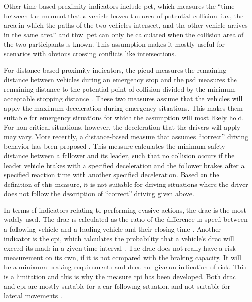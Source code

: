 Other time-based proximity indicators include \ac{pet}, which measures the ``time between the moment that a vehicle leaves the area of potential collision, i.e., the area in which the paths of the two vehicles intersect, and the other vehicle arrives in the same area'' \autocite{mahmud2017application} and \ac{thw}.
\cstartb \ac{pet} can only be calculated when the collision area of the two participants is known. 
This assumption makes it mostly useful for scenarios with obvious crossing conflicts like intersections. \cendb

For distance-based proximity indicators, the \ac{picud} measures the remaining distance between vehicles during an emergency stop \autocite{iida2001traffic, uno2003objective} and the \ac{psd} measures the remaining distance to the potential point of collision divided by the minimum acceptable stopping distance \autocite{allen1978analysis, guido2011comparing, mahmud2017application}. 
\cstartb These two measures assume that the vehicles will apply the maximum deceleration during emergency situations. 
This makes them suitable for emergency situations for which the assumption will most likely hold. 
For non-critical situations, however, the deceleration that the drivers will apply may vary. \cendb
More recently, a distance-based measure that assumes ``correct'' driving behavior has been proposed \autocite{shalev2017formal}. 
This measure calculates the minimum safety distance between a follower and its leader, such that no collision occurs if the leader vehicle brakes with a specified deceleration and the follower brakes after a specified reaction time with another specified deceleration. 
\cstartb Based on the definition of this measure, it is not suitable for driving situations where the driver does not follow the description of ``correct'' driving given above. \cendb

In terms of indicators relating to performing evasive actions, the \ac{drac} is the most widely used. 
The \ac{drac} is calculated as the ratio of the difference in speed between a following vehicle and a leading vehicle and their closing time \autocite{almqvist1991use, mahmud2017application}. 
Another indicator is the \ac{cpi}, which calculates the probability that a vehicle's \ac{drac} will exceed its \ac{madr} in a given time interval \autocite{cunto2009simulated}. 
\cstartc The \ac{drac} does not really have a risk measurement on its own, if it is not compared with the braking capacity.
It will be a minimum braking requirements and does not give an indication of risk.
This is a limitation and this is why the measure \ac{cpi} has been developed. \cendc
\cstartb Both \ac{drac} and \ac{cpi} are mostly suitable for a car-following situation and not suitable for lateral movements \autocite{mahmud2017application}. \cendb

